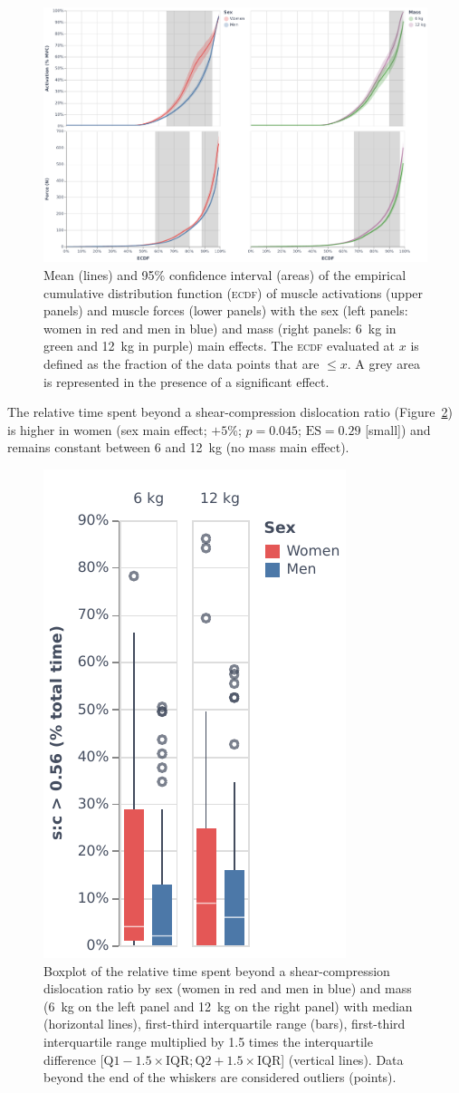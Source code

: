 \begin{figure}[H]
    \centering\includegraphics[width=1\linewidth]{fig/ecdf_effects.pdf}
    \caption{Mean (lines) and 95\% confidence interval (areas) of the empirical cumulative distribution function (\textsc{ecdf}) of muscle activations (upper panels) and muscle forces (lower panels) with the sex (left panels: women in red and men in blue) and mass (right panels: 6~kg in green and 12~kg in purple) main effects.
    The \textsc{ecdf} evaluated at $x$ is defined as the fraction of the data points that are $\leq x$.
    A grey area is represented in the presence of a significant effect.}
    \label{fig:ecdf_effects}
\end{figure}

The relative time spent beyond a shear-compression dislocation ratio (Figure~\ref{fig:dislocation}) is higher in women (sex main effect; $+5$\%; $p = 0.045$; $\textrm{ES} = 0.29$ [small]) and remains constant between 6 and 12~kg (no mass main effect).

\begin{figure}[H]
    \centering\includegraphics[width=0.3\linewidth]{fig/dislocation.pdf}
    \caption{Boxplot of the relative time spent beyond a shear-compression dislocation ratio by sex (women in red and men in blue) and mass (6~kg on the left panel and 12~kg on the right panel) with median (horizontal lines), first-third interquartile range (bars), first-third interquartile range multiplied by 1.5 times the interquartile difference [$\textrm{Q1} - 1.5 \times \textrm{IQR}; \textrm{Q2} + 1.5 \times \textrm{IQR}$] (vertical lines).
    Data beyond the end of the whiskers are considered outliers (points).}
    \label{fig:dislocation}
\end{figure}